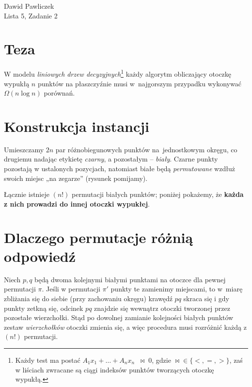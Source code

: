 \documentclass[11pt,a4paper]{article}
\begin{document}
\begin{center}
\Large Dawid Pawliczek\\
Lista 5, Zadanie 2
\end{center}

\bigskip
\section*{Teza}

W modelu \emph{liniowych drzew decyzyjnych}\footnote{
Każdy test ma postać
$A_1x_1+\dots+A_nx_n\;\;\mathop{\bowtie}\;0$,
gdzie $\bowtie\in\{<,=,>\}$, zaś w liściach
zwracane są ciągi indeksów punktów tworzących otoczkę wypukłą.}
każdy algorytm obliczający otoczkę wypukłą
$n$ punktów na płaszczyźnie
musi w~najgorszym przypadku wykonywać
$\Omega(n\log n)$ porównań.

\section*{Konstrukcja instancji}

Umieszczamy $2n$ par różnobiegunowych punktów
na~jednostkowym okręgu, co drugiemu
nadając etykietę \emph{czarny}, a pozostałym – \emph{biały}.
Czarne punkty pozostają w ustalonych pozycjach,
natomiast białe będą \emph{permuto­wane}
wzdłuż swoich miejsc „na zegarze”
(rysunek pomijamy).

Łącznie istnieje $(n!)$ permutacji białych punktów;
poniżej pokażemy, że \textbf{każda z nich
prowadzi do innej otoczki wypukłej}.

\section*{Dlaczego permutacje różnią odpowiedź}

Niech $p,q$ będą dwoma kolejnymi białymi punktami
na otoczce dla pewnej permutacji $\pi$.
Jeśli w permutacji $\pi'$ punkty te zamienimy miejscami,
to w~miarę zbliżania się do siebie
(przy zachowaniu okręgu)
krawędź $pq$ skraca się i gdy punkty zetkną się,
odcinek $pq$ znajdzie się wewnątrz
otoczki tworzonej przez pozostałe wierzchołki.
Stąd po dowolnej zamianie kolejności białych punktów
zestaw \emph{wierzchołków} otoczki zmienia się,
a więc procedura musi rozróżnić
każdą z $(n!)$ permutacji.

\end{document}
